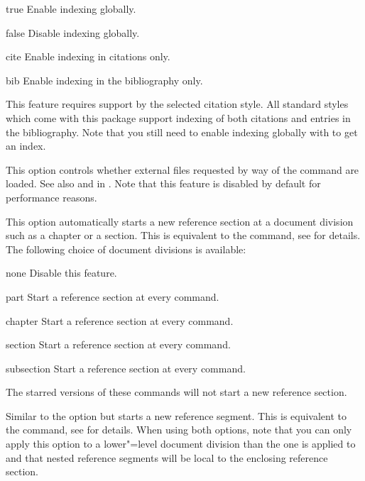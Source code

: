 \documentclass{ltxdockit}[2011/03/25]
\begin{document}
\begin{optionlist}
\begin{valuelist}
\item[true] Enable indexing globally.
\item[false] Disable indexing globally.
\item[cite] Enable indexing in citations only.
\item[bib] Enable indexing in the bibliography only.
\end{valuelist}

This feature requires support by the selected citation style. All standard styles which come with this package support indexing of both citations and entries in the bibliography. Note that you still need to enable indexing globally with  to get an index.


This option controls whether external files requested by way of the  command are loaded. See also  and  in . Note that this feature is disabled by default for performance reasons.


This option automatically starts a new reference section at a document division such as a chapter or a section. This is equivalent to the  command, see  for details. The following choice of document divisions is available:

\begin{valuelist}
\item[none] Disable this feature.
\item[part] Start a reference section at every  command.
\item[chapter] Start a reference section at every  command.
\item[section] Start a reference section at every  command.
\item[subsection] Start a reference section at every  command.
\end{valuelist}
%
The starred versions of these commands will not start a new reference section.


Similar to the  option but starts a new reference segment. This is equivalent to the  command, see  for details. When using both options, note that you can only apply this option to a lower"=level document division than the one  is applied to and that nested reference segments will be local to the enclosing reference section.


\end{optionlist}
\end{document}

